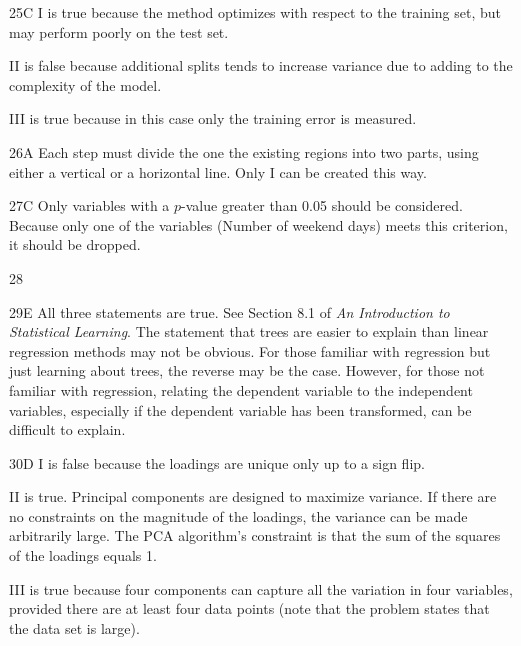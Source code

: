 \begin{solution}{25}{C}
I is true because the method optimizes with respect to the training set, but may perform poorly on the test set.

II is false because additional splits tends to increase variance due to adding to the complexity of the model.

III is true because in this case only the training error is measured.
\end{solution}

\begin{solution}{26}{A}
Each step must divide the one the existing regions into two parts, using either a vertical or a horizontal line. Only I can be created this way.
\end{solution}

\begin{solution}{27}{C}
Only variables with a $p$-value greater than 0.05 should be considered. Because only one of the variables (Number of weekend days) meets this criterion, it should be dropped.
\end{solution}

\begin{solution}{28}{}
\deleted
\end{solution}

\begin{solution}{29}{E}
All three statements are true. See Section 8.1 of \textit{An Introduction to Statistical Learning}. The statement that trees are easier to explain than linear regression methods may not be obvious. For those familiar with regression but just learning about trees, the reverse may be the case. However, for those not familiar with regression, relating the dependent variable to the independent variables, especially if the dependent variable has been transformed, can be difficult to explain.
\end{solution}

\begin{solution}{30}{D}
I is false because the loadings are unique only up to a sign flip.

II is true. Principal components are designed to maximize variance. If there are no constraints on the magnitude of the loadings, the variance can be made arbitrarily large. The PCA algorithm's constraint is that the sum of the squares of the loadings equals 1.

III is true because four components can capture all the variation in four variables, provided there are at least four data points (note that the problem states that the data set is large).
\end{solution}

